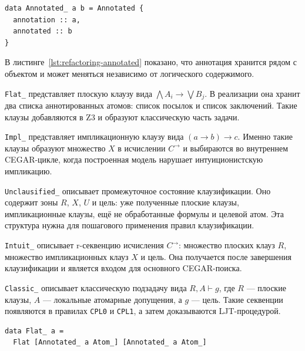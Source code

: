 \documentclass[14pt, russian]{scrartcl}
\begin{document}
\begin{listing}[!htb]
\caption{Универсальная аннотация \texttt{Annotated\_}}
\label{lst:refactoring-annotated}
\begin{verbatim}
data Annotated_ a b = Annotated {
  annotation :: a,
  annotated :: b
}
\end{verbatim}
\end{listing}

В листинге~\ref{lst:refactoring-annotated} показано, что аннотация хранится
рядом с объектом и может меняться независимо от логического содержимого.

\texttt{Flat\_} представляет плоскую клаузу вида
$\bigwedge A_i \rightarrow \bigvee B_j$. В реализации она хранит два списка
аннотированных атомов: список посылок и список заключений. Такие клаузы
добавляются в Z3 и образуют классическую часть задачи.

\texttt{Impl\_} представляет импликационную клаузу вида
$(a \rightarrow b) \rightarrow c$. Именно такие клаузы образуют множество $X$ в
исчислении $C^{\rightarrow}$ и выбираются во внутреннем CEGAR-цикле, когда
построенная модель нарушает интуиционистскую импликацию.

\texttt{Unclausified\_} описывает промежуточное состояние клаузификации. Оно
содержит зоны $R$, $X$, $U$ и цель: уже полученные плоские клаузы,
импликационные клаузы, ещё не обработанные формулы и целевой атом. Эта
структура нужна для пошагового применения правил клаузификации.

\texttt{Intuit\_} описывает r-секвенцию исчисления $C^{\rightarrow}$:
множество плоских клауз $R$, множество импликационных клауз $X$ и цель. Она
получается после завершения клаузификации и является входом для основного
CEGAR-поиска.

\texttt{Classic\_} описывает классическую подзадачу вида $R, A \vdash g$, где
$R$ --- плоские клаузы, $A$ --- локальные атомарные допущения, а $g$ --- цель.
Такие секвенции появляются в правилах \texttt{CPL0} и \texttt{CPL1}, а затем
доказываются LJT-процедурой.

\begin{listing}[!htb]
\caption{Тип плоской клаузы \texttt{Flat\_}}
\label{lst:refactoring-flat}
\begin{verbatim}
data Flat_ a =
  Flat [Annotated_ a Atom_] [Annotated_ a Atom_]
\end{verbatim}
\end{listing}
\end{document}
